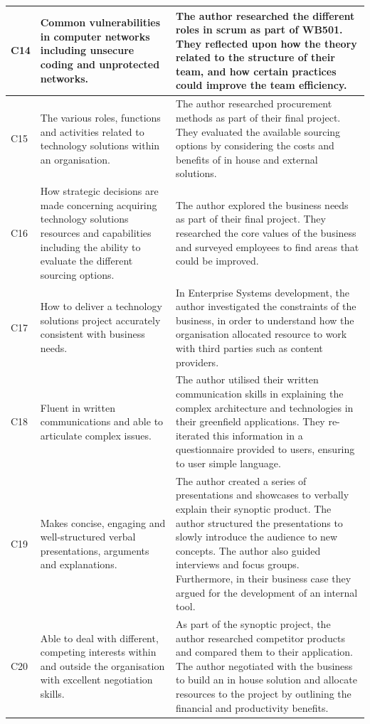 \documentclass{article}
\begin{document}
\begin{landscape}
\begin{longtable}{|l|p{10cm}|p{10cm}|}
C14 &
  Common vulnerabilities in   computer networks including unsecure coding and unprotected networks. &
  The author researched the different roles in scrum as part of   WB501. They reflected upon how the theory related to the structure of their   team, and how certain practices could improve the team efficiency. \\ \hline
C15 &
  The various roles, functions   and activities related to technology solutions within an organisation. &
  The author researched   procurement methods as part of their final project. They evaluated the   available sourcing options by considering the costs and benefits of in house   and external solutions. \\ \hline
C16 &
  How strategic decisions are   made concerning acquiring technology solutions resources and capabilities   including the ability to evaluate the different sourcing options. &
  The author explored the business needs as part of their final   project. They researched the core values of the business and surveyed   employees to find areas that could be improved. \\ \hline
C17 &
  How to deliver a technology   solutions project accurately consistent with business needs. &
  In Enterprise Systems   development, the author investigated the constraints of the business, in   order to understand how the organisation allocated resource to work with   third parties such as content providers. \\ \hline
C18 &
  Fluent in written   communications and able to articulate complex issues. &
  The author utilised their   written communication skills in explaining the complex architecture and   technologies in their greenfield applications. They re-iterated this   information in a questionnaire provided to users, ensuring to user simple   language. \\ \hline
C19 &
  Makes concise, engaging and   well-structured verbal presentations, arguments and explanations. &
  The author created a series of   presentations and showcases to verbally explain their synoptic product. The   author structured the presentations to slowly introduce the audience to new   concepts. The author also guided interviews and focus groups. Furthermore, in   their business case they argued for the development of an internal tool. \\ \hline
C20 &
  Able to deal with different,   competing interests within and outside the organisation with excellent   negotiation skills. &
  As part of the synoptic   project, the author researched competitor products and compared them to their   application. The author negotiated with the business to build an in house   solution and allocate resources to the project by outlining the financial and   productivity benefits. \\ \hline

\end{longtable}
\end{landscape}
\end{document}
